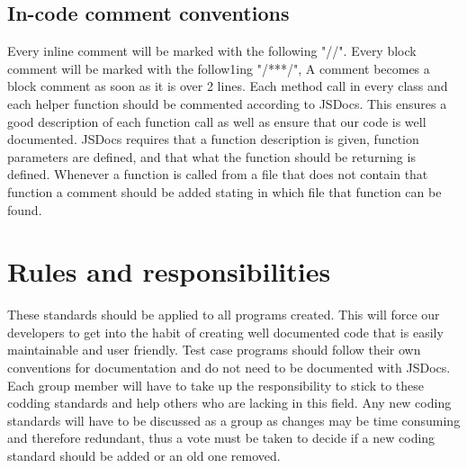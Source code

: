 \documentclass[a4paper]{article}
\begin{document}
\subsection{In-code comment conventions}
Every inline comment will be marked with the following "//". Every block comment will be marked with the follow1ing "/***/", A comment becomes a block comment as soon as it is over 2 lines.
Each method call in every class and each helper function should be commented according to JSDocs. This ensures a good description of each function call as well as ensure that our code is well documented. JSDocs requires that a function description is given, function parameters are defined, and that what the function should be returning is defined.
Whenever a function is called from a file that does not contain that function a comment should be added stating in which file that function can be found.

\section{Rules and responsibilities}
These standards should be applied to all programs created. This will force our developers to get into the habit of creating well documented code that is easily maintainable and user friendly. Test case programs should follow their own conventions for documentation and do not need to be documented with JSDocs. Each group member will have to take up the responsibility to stick to these codding standards and help others who are lacking in this field. Any new coding standards will have to be discussed as a group as changes may be time consuming and therefore redundant, thus a vote must be taken to decide if a new coding standard should be added or an old one removed.
\end{document}
